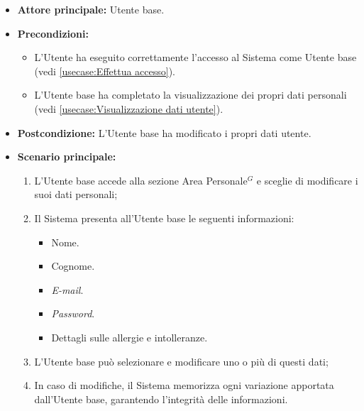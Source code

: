\label{usecase:Modifica dati utente}
\begin{itemize}
	\item \textbf{Attore principale:} Utente base.

	\item \textbf{Precondizioni:}
	      \begin{itemize}
		      \item L'Utente ha eseguito correttamente l'accesso al Sistema come Utente base (vedi \autoref{usecase:Effettua accesso}).
		      \item L'Utente base ha completato la visualizzazione dei propri
		            dati personali (vedi \autoref{usecase:Visualizzazione dati utente}).
	      \end{itemize}

	\item \textbf{Postcondizione:} L'Utente base ha modificato i propri dati utente.

	\item \textbf{Scenario principale:}
	      \begin{enumerate}
		      \item L'Utente base accede alla sezione Area Personale$^G$ e sceglie di modificare i suoi dati personali;
		      \item Il Sistema presenta all'Utente base le seguenti informazioni:
		            \begin{itemize}
			            \item Nome.
			            \item Cognome.
			            \item \textit{E-mail}.
			            \item \textit{Password}.
			            \item Dettagli sulle allergie e intolleranze.
		            \end{itemize}
		      \item L'Utente base può selezionare e modificare uno o più di questi dati;
		      \item In caso di modifiche, il Sistema memorizza ogni variazione apportata dall'Utente base, garantendo l'integrità delle informazioni.
	      \end{enumerate}
\end{itemize}
